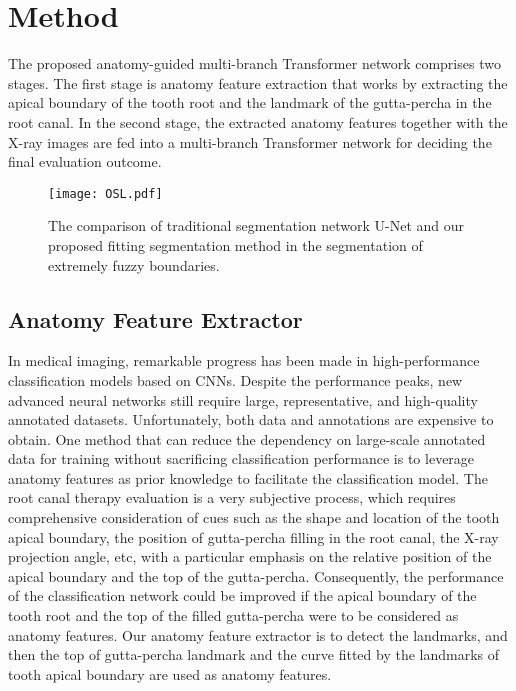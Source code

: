 \documentclass[journal]{IEEEtran}
\begin{document}

\section{Method}
The proposed anatomy-guided multi-branch Transformer network comprises two stages. The first stage is anatomy feature extraction that works by extracting the apical boundary of the tooth root and the landmark of the gutta-percha in the root canal. In the second stage, the extracted anatomy features together with the X-ray images are fed into a multi-branch Transformer network for deciding the final evaluation outcome.

\begin{figure}[ht]
\centering
  \texttt{[image: OSL.pdf]}
  \caption{The comparison of traditional segmentation network U-Net and our proposed fitting segmentation method in the segmentation of extremely fuzzy boundaries.}
  \label{fig:osl}
\end{figure}



\subsection{Anatomy Feature Extractor}
In medical imaging, remarkable progress has been made in high-performance classification models based on CNNs. Despite the performance peaks, new advanced neural networks still require large, representative, and high-quality annotated datasets. Unfortunately, both data and annotations are expensive to obtain\cite{tajbakhsh2020embracing,pasupa2016comparison}. One method that can reduce the dependency on large-scale annotated data for training without sacrificing classification performance is to leverage anatomy features as prior knowledge to facilitate the classification model\cite{tran2021segmentation}. The root canal therapy evaluation is a very subjective process, which requires comprehensive consideration of cues such as the shape and location of the tooth apical boundary, the position of gutta-percha filling in the root canal, the X-ray projection angle, etc, with a particular emphasis on the relative position of the apical boundary and the top of the gutta-percha. Consequently, the performance of the classification network could be improved if the apical boundary of the tooth root and the top of the filled gutta-percha were to be considered as anatomy features. Our anatomy feature extractor is to detect the landmarks, and then the top of gutta-percha landmark and the curve fitted by the landmarks of tooth apical boundary are used as anatomy features.
\end{document}
